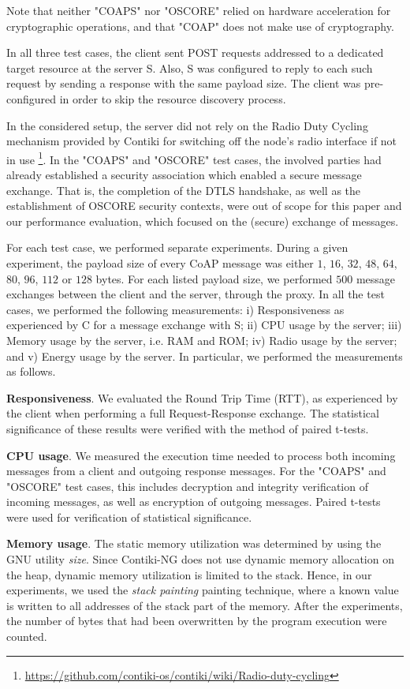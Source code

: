 {Note that neither "COAPS" nor "OSCORE" relied on hardware acceleration for cryptographic operations, and that "COAP" does not make use of cryptography.

In all three test cases, the client sent POST requests addressed to a dedicated target resource at the server S. Also, S was configured to reply to each such request by sending a response with the same payload size. The client was pre-configured in order to skip the resource discovery process.

In the considered setup, the server did not rely on the Radio Duty Cycling mechanism provided by Contiki for switching off the node's radio interface if not in use \footnote{\url{https://github.com/contiki-os/contiki/wiki/Radio-duty-cycling}}. In the "COAPS" and "OSCORE" test cases, the involved parties had already established a security association which enabled a secure message exchange. That is, the completion of the DTLS handshake, as well as the establishment of OSCORE security contexts, were out of scope for this paper and our performance evaluation, which focused on the (secure) exchange of messages.

For each test case, we performed separate experiments. During a given experiment, the payload size of every CoAP message was either $1$, $16$, $32$, $48$, $64$, $80$, $96$, $112$ or $128$ bytes. For each listed payload size, we performed $500$ message exchanges between the client and the server, through the proxy. In all the test cases, we performed the following measurements: i) Responsiveness as experienced by C for a message exchange with S; ii) CPU usage by the server; iii) Memory usage by the server, i.e. RAM and ROM; iv) Radio usage by the server; and v) Energy usage by the server. In particular, we performed the measurements as follows.

\noindent
\textbf{Responsiveness}. We evaluated the Round Trip Time (RTT), as experienced by the client when performing a full Request-Response exchange. The statistical significance of these results were verified with the method of paired t-tests.

\noindent
\textbf{CPU usage}. We measured the execution time needed to process both incoming messages from a client and  outgoing response messages. For the "COAPS" and "OSCORE" test cases, this includes decryption and integrity verification of incoming messages, as well as encryption of outgoing messages. Paired t-tests were used for verification of statistical significance.

\noindent
\textbf{Memory usage}. The static memory utilization was determined by using the GNU utility \emph{size}. Since Contiki-NG does not use dynamic memory allocation on the heap, dynamic memory utilization is limited to the stack. Hence, in our experiments, we used the \textit{stack painting} painting technique, where a known value is written to all addresses of the stack part of the memory. After the experiments, the number of bytes that had been overwritten by the program execution were counted.

}
